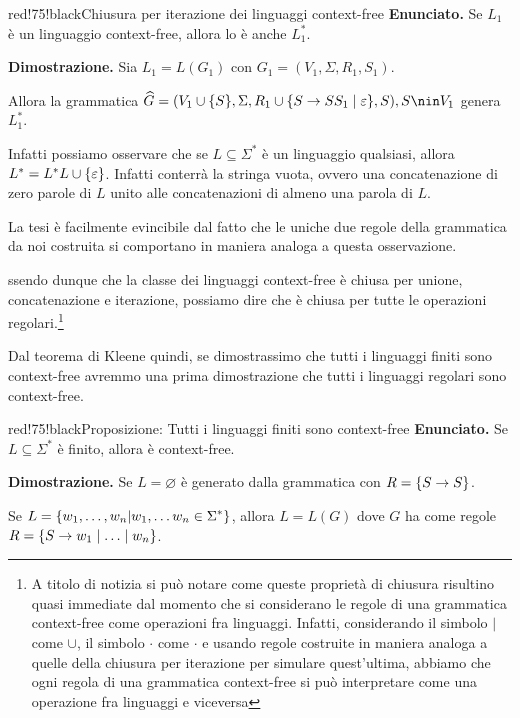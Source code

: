 \begin{halfframedbox}{red!75!black}{Chiusura per iterazione dei linguaggi context-free}
  \textbf{Enunciato.} Se $L_1$ è un linguaggio context-free, allora lo è anche $L_1^*$.

  \begin{center}
    \textcolor{red!75!black}{\hdashrule[0.5ex]{18cm}{1pt}{3mm 3pt 1mm 2pt}}
  \end{center}

  \textbf{Dimostrazione.} Sia $L_1 = L(G_1)$ con $G_1 = (V_1, \Sigma, R_1, S_1)$.

  Allora la grammatica $\widehat{G} = \rbrakets{V_1 \cup \cbrakets{S}, \Sigma, R_1 \cup \cbrakets{S \to SS_1 \mid \varepsilon}, S}, S \nin V_1$ genera $L_1^*$.

  Infatti possiamo osservare che se $L \subseteq \Sigma^*$ è un linguaggio qualsiasi, allora $L^* = L^*L \cup \displaystyle{\left\{{\varepsilon}\right\}} $. Infatti conterrà la stringa vuota, ovvero una concatenazione di zero parole di $L$ unito alle concatenazioni di almeno una parola di $L$.

  La tesi è facilmente evincibile dal fatto che le uniche due regole della grammatica da noi costruita si comportano in maniera analoga a questa osservazione.
\end{halfframedbox}

ssendo dunque che la classe dei linguaggi context-free è chiusa per unione, concatenazione e iterazione, possiamo dire che è chiusa per tutte le operazioni regolari.\footnote{A titolo di notizia si può notare come queste proprietà di chiusura risultino quasi immediate dal momento che si considerano le regole di una grammatica context-free come operazioni fra linguaggi. Infatti, considerando il simbolo $\mid$ come $\cup$, il simbolo $\cdot$ come $\cdot$ e usando regole costruite in maniera analoga a quelle della chiusura per iterazione per simulare quest'ultima, abbiamo che ogni regola di una grammatica context-free si può interpretare come una operazione fra linguaggi e viceversa}

Dal teorema di Kleene quindi, se dimostrassimo che tutti i linguaggi finiti sono context-free avremmo una prima dimostrazione che tutti i linguaggi regolari sono context-free.

\begin{halfframedbox} {red!75!black}{Proposizione: Tutti i linguaggi finiti sono context-free}
  \textbf{Enunciato.} Se $ L \subseteq \Sigma^*$ è finito, allora è context-free.

  \begin{center}
    \textcolor{red!75!black}{\hdashrule[0.5ex]{18cm}{1pt}{3mm 3pt 1mm 2pt}}
  \end{center}

  \textbf{Dimostrazione.} Se $L= \varnothing$ è generato dalla grammatica con $R=\displaystyle{\left\{{S\to S}\right\}}$.

  Se $L = \displaystyle{\left\{{w_1, \ldots, w_n \vert w_1, \ldots w_n \in \Sigma^*}\right\}}$, allora $L=L(G)$ dove $G$ ha come regole $R = \displaystyle{\left\{{S \to w_1 \mid \ldots \mid w_n}\right\}}$.

\end{halfframedbox}

